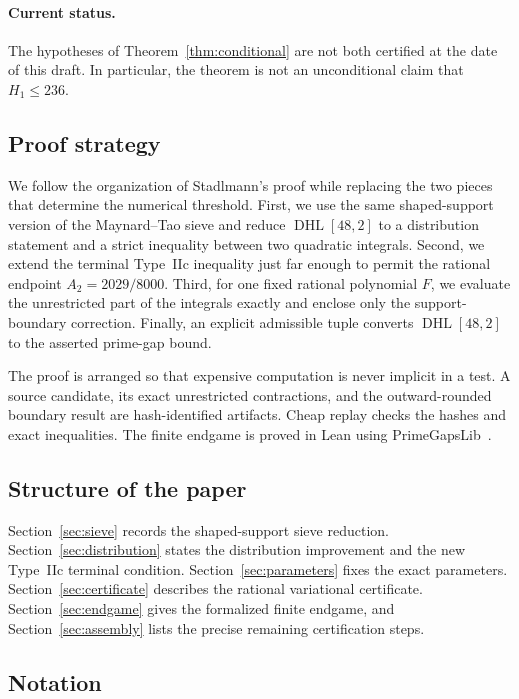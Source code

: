 \documentclass[11pt]{amsart}
\theoremstyle{definition}
\newcommand{\DHL}{\operatorname{DHL}}
\begin{document}
\paragraph{Current status.}
The hypotheses of Theorem~\ref{thm:conditional} are not both certified at
the date of this draft.  In particular, the theorem is not an unconditional
claim that $H_1\leq236$.

\subsection{Proof strategy}

We follow the organization of Stadlmann's proof while replacing the two pieces
that determine the numerical threshold.  First, we use the same shaped-support
version of the Maynard--Tao sieve and reduce $\DHL[48,2]$ to a distribution
statement and a strict inequality between two quadratic integrals.  Second, we
extend the terminal Type~IIc inequality just far enough to permit the rational
endpoint $A_2=2029/8000$.  Third, for one fixed rational polynomial $F$, we
evaluate the unrestricted part of the integrals exactly and enclose only the
support-boundary correction.  Finally, an explicit admissible tuple converts
$\DHL[48,2]$ to the asserted prime-gap bound.

The proof is arranged so that expensive computation is never implicit in a
test.  A source candidate, its exact unrestricted contractions, and the
outward-rounded boundary result are hash-identified artifacts.  Cheap replay
checks the hashes and exact inequalities.  The finite endgame is proved in
Lean using PrimeGapsLib~\cite{PrimeGapsLib}.

\subsection{Structure of the paper}

Section~\ref{sec:sieve} records the shaped-support sieve reduction.
Section~\ref{sec:distribution} states the distribution improvement and the
new Type~IIc terminal condition.  Section~\ref{sec:parameters} fixes the exact
parameters.  Section~\ref{sec:certificate} describes the rational variational
certificate.  Section~\ref{sec:endgame} gives the formalized finite endgame,
and Section~\ref{sec:assembly} lists the precise remaining certification steps.

\subsection{Notation}
\end{document}
